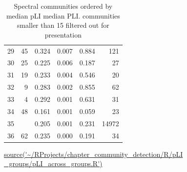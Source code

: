\begin{table}[ht]
\begin{tabular}{rrrrrr}
  29 & 45 & 0.324 & 0.007 & 0.884 & 121 \\ 
  30 & 25 & 0.225 & 0.006 & 0.187 & 27 \\ 
  31 & 19 & 0.233 & 0.004 & 0.546 & 20 \\ 
  32 & 9 & 0.283 & 0.002 & 0.855 & 62 \\ 
  33 & 4 & 0.292 & 0.001 & 0.631 & 31 \\ 
  34 & 48 & 0.161 & 0.001 & 0.059 & 23 \\ 
  35 &  & 0.205 & 0.001 & 0.231 & 14972 \\ 
  36 & 62 & 0.235 & 0.000 & 0.191 & 34 \\ 
   \bottomrule
\end{tabular}
\caption[Spectral communities ordered by pLI]{Spectral communities ordered by median pLI median PLI. communities smaller than 15 filtered out for presentation}
\tiny\url{source('~/RProjects/chapter_community_detection/R/pLI _groups/pLI_across_groups.R')}
\label{tab: pli across groups}
\end{table}

